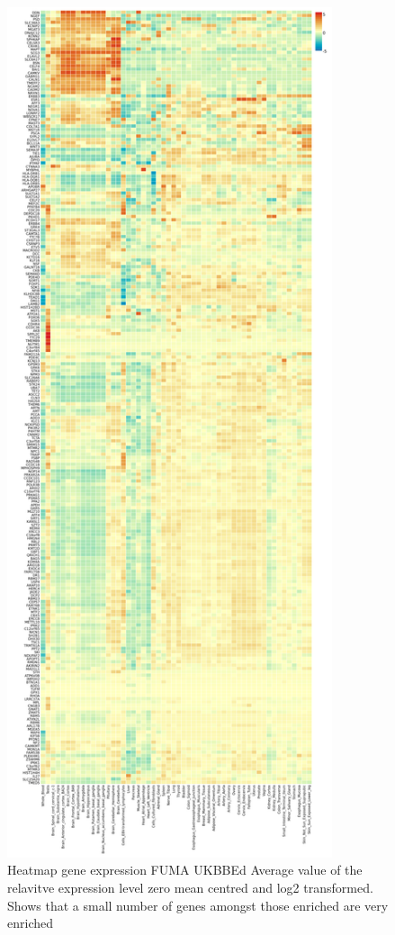 \begin{figure}
    \centering
    \includegraphics[height=25cm]{images/FUMA_plots/expHeat_FUMA_gene2func-2_ukbbed_zeromean.png}
    \caption{Heatmap gene expression FUMA UKBBEd Average value of the relavitve expression level zero mean centred and log2 transformed. Shows that a small number of genes amongst those enriched are very enriched}
    \label{fig:my_label}
\end{figure}







